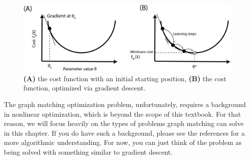 \begin{figure}[h]
    \centering
    \includegraphics[width=\linewidth]{applications/ch8/Images/grad_desc.png}
    \caption[Gradient descent]{\textbf{(A)} the cost function with an initial starting position, \textbf{(B)} the cost function, optimized via gradient descent.}
    \label{fig:ch8:gm:grad_desc}
\end{figure}

The graph matching optimization problem, unfortunately, requires a background in nonlinear optimization, which is beyond the scope of this textbook. For that reason, we will focus heavily on the types of problems graph matching can solve in this chapter. If you do have such a background, please see the references for a more algorithmic understanding. For now, you can just think of the problem as being solved with something similar to gradient descent.

